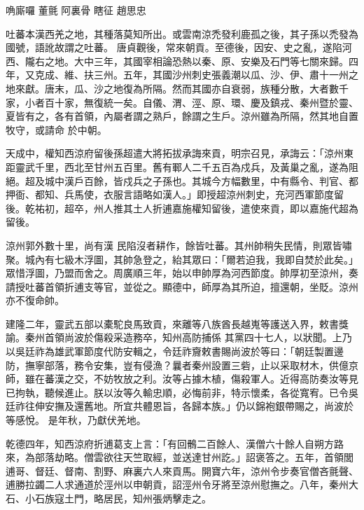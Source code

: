 
\begin{pinyinscope}

 唃廝囉 董氈 阿裏骨 瞎征 趙思忠



 吐蕃本漢西羌之地，其種落莫知所出。或雲南涼禿發利鹿孤之後，其子孫以禿發為國號，語訛故謂之吐蕃。
 唐貞觀後，常來朝貢。至德後，因安、史之亂，遂陷河西、隴右之地。大中三年，其國宰相論恐熱以秦、原、安樂及石門等七關來歸。四年，又克成、維、扶三州。五年，其國沙州刺史張義潮以瓜、沙、伊、肅十一州之地來獻。唐末，瓜、沙之地復為所隔。然而其國亦自衰弱，族種分散，大者數千家，小者百十家，無復統一矣。自儀、渭、涇、原、環、慶及鎮戎、秦州暨於靈、夏皆有之，各有首領，內屬者謂之熟戶，餘謂之生戶。涼州雖為所隔，然其地自置牧守，或請命
 於中朝。



 天成中，權知西涼府留後孫超遣大將拓拔承誨來貢，明宗召見，承誨云：「涼州東距靈武千里，西北至甘州五百里。舊有鄆人二千五百為戍兵，及黃巢之亂，遂為阻絕。超及城中漢戶百餘，皆戍兵之子孫也。其城今方幅數里，中有縣令、判官、都押衙、都知、兵馬使，衣服言語略如漢人。」即授超涼州刺史，充河西軍節度留後。乾祐初，超卒，州人推其土人折逋嘉施權知留後，遣使來貢，即以嘉施代超為留後。



 涼州郭外數十里，尚有漢
 民陷沒者耕作，餘皆吐蕃。其州帥稍失民情，則眾皆嘯聚。城內有七級木浮圖，其帥急登之，紿其眾曰：「爾若迫我，我即自焚於此矣。」眾惜浮圖，乃盟而舍之。周廣順三年，始以申帥厚為河西節度。帥厚初至涼州，奏請授吐蕃首領折逋支等官，並從之。顯德中，師厚為其所迫，擅還朝，坐貶。涼州亦不復命帥。



 建隆二年，靈武五部以橐駝良馬致貢，來離等八族酋長越嵬等護送入界，敕書獎諭。秦州首領尚波於傷殺采造務卒，知州高防捕係
 其黨四十七人，以狀聞。上乃以吳廷祚為雄武軍節度代防安輯之，令廷祚齎敕書賜尚波於等曰：「朝廷製置邊防，撫寧部落，務令安集，豈有侵漁？曩者秦州設置三砦，止以采取材木，供億京師，雖在蕃漢之交，不妨牧放之利。汝等占據木植，傷殺軍人。近得高防奏汝等見已拘執，聽候進止。朕以汝等久輸忠順，必悔前非，特示懷柔，各從寬宥。已令吳廷祚往伸安撫及還舊地。所宜共體恩旨，各歸本族。」仍以錦袍銀帶賜之，尚波於等感悅。
 是年秋，乃獻伏羌地。



 乾德四年，知西涼府折逋葛支上言：「有回鶻二百餘人、漢僧六十餘人自朔方路來，為部落劫略。僧雲欲往天竺取經，並送達甘州訖。」詔褒答之。五年，首領閭逋哥、督廷、督南、割野、麻裏六人來貢馬。開寶六年，涼州令步奏官僧吝氈聲、逋勝拉蠲二人求通道於涇州以申朝貢，詔涇州令牙將至涼州慰撫之。八年，秦州大石、小石族寇土門，略居民，知州張炳擊走之。




\end{pinyinscope}
